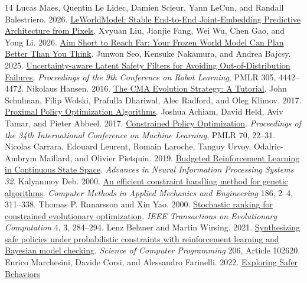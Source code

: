 \documentclass[sigconf,nonacm]{acmart}
\begin{document}
\begin{thebibliography}{14}
 Lucas Maes, Quentin Le Lidec, Damien Scieur, Yann LeCun, and
Randall Balestriero. 2026. \href{https://arxiv.org/abs/2603.19312}{LeWorldModel:
Stable End-to-End Joint-Embedding Predictive Architecture from Pixels}.
 Xvyuan Liu, Jianjie Fang, Wei Wu, Chen Gao, and Yong Li. 2026.
\href{https://arxiv.org/abs/2609.30036}{Aim Short to Reach Far: Your Frozen World
Model Can Plan Better Than You Think}.
 Junwon Seo, Kensuke Nakamura, and Andrea Bajcsy. 2025.
\href{https://proceedings.mlr.press/v305/seo25a.html}{Uncertainty-aware Latent
Safety Filters for Avoiding Out-of-Distribution Failures}.
\emph{Proceedings of the 9th Conference on Robot Learning}, PMLR 305, 4442--4472.
 Nikolaus Hansen. 2016.
\href{https://arxiv.org/abs/1604.00772}{The CMA Evolution Strategy: A Tutorial}.
 John Schulman, Filip Wolski, Prafulla Dhariwal, Alec Radford, and
Oleg Klimov. 2017. \href{https://arxiv.org/abs/1707.06347}{Proximal Policy
Optimization Algorithms}.
 Joshua Achiam, David Held, Aviv Tamar, and Pieter Abbeel. 2017.
\href{https://proceedings.mlr.press/v70/achiam17a.html}{Constrained Policy Optimization}.
\emph{Proceedings of the 34th International
Conference on Machine Learning}, PMLR 70, 22--31.
 Nicolas Carrara, Edouard Leurent, Romain Laroche, Tanguy Urvoy,
Odalric-Ambrym Maillard, and Olivier Pietquin. 2019.
\href{https://papers.nips.cc/paper_files/paper/2019/hash/4fe5149039b52765bde64beb9f674940-Abstract.html}{Budgeted
Reinforcement Learning in Continuous State Space}.
\emph{Advances in Neural Information Processing Systems 32}.
 Kalyanmoy Deb. 2000.
\href{https://doi.org/10.1016/S0045-7825(99)00389-8}{An efficient constraint handling
method for genetic algorithms}. \emph{Computer Methods in Applied Mechanics and
Engineering} 186, 2--4, 311--338.
 Thomas P. Runarsson and Xin Yao. 2000.
\href{https://doi.org/10.1109/4235.873238}{Stochastic ranking for constrained
evolutionary optimization}. \emph{IEEE Transactions on Evolutionary Computation}
4, 3, 284--294.
 Lenz Belzner and Martin Wirsing. 2021.
\href{https://doi.org/10.1016/j.scico.2021.102620}{Synthesizing safe policies under
probabilistic constraints with reinforcement learning and Bayesian model checking}.
\emph{Science of Computer Programming} 206, Article 102620.
 Enrico Marchesini, Davide Corsi, and Alessandro Farinelli. 2022.
\href{https://ojs.aaai.org/index.php/AAAI/article/view/20737}{Exploring Safer Behaviors
}
\end{thebibliography}
\end{document}
